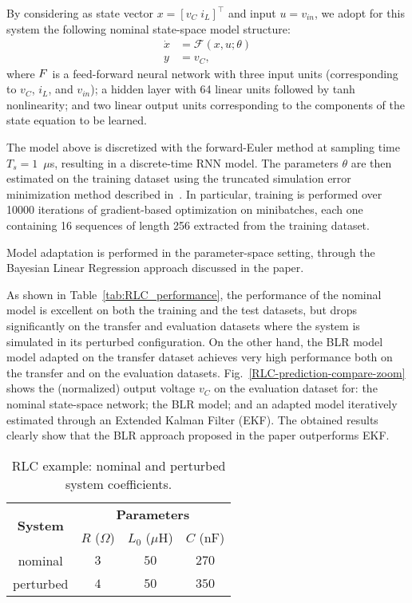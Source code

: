 \documentclass{article}
\newcommand{\F}{\mathcal{F}}
\begin{document}
By considering as state vector $x = [v_C\; i_L]^\top$ and input $u=v_{in}$, we adopt for this system the following nominal state-space model structure:
\begin{align*}
\dot x & = \mathcal{F}(x, u; \theta) \\
 y &= v_{C},
\end{align*}
where $\mathcal \F$ is a feed-forward neural network with three input units (corresponding to $v_C$, $i_L$, and $v_{in}$); a hidden layer with 64 linear units followed by tanh nonlinearity; and two linear output units corresponding to the components of the state equation to be learned. 

The model above is discretized with the forward-Euler method at sampling time $T_s = 1$~$\mu$s, resulting in a 
discrete-time RNN model. The parameters $\theta$ are then estimated on the training dataset using the  {truncated simulation error minimization} method described in~\cite{forgione2021continuous}. 
In particular, training is performed over 10000 iterations of gradient-based optimization on minibatches, each one containing
16 sequences of length 256 extracted from the training dataset. 

Model adaptation is performed in the parameter-space setting, through  the Bayesian Linear Regression approach discussed in the paper. 

As shown in Table~\ref{tab:RLC_performance}, the performance of the nominal model is excellent on both
the training and the test datasets,  but drops significantly on the transfer and evaluation datasets where the system is simulated in its perturbed configuration. On the other hand, the BLR model model adapted on the transfer dataset achieves very high performance both on the transfer and on the evaluation datasets. Fig.~\ref{RLC-prediction-compare-zoom} shows the (normalized) output voltage $v_C$ on the evaluation dataset for: the nominal state-space network; the BLR model; and an adapted model iteratively estimated through an Extended Kalman Filter (EKF). The obtained results clearly show that the BLR approach proposed in the paper outperforms EKF. 
 

\begin{table}%
\centering
\begin{tabular}{c | c  c  c}
\multirow{2}{*}{\textbf{System}} & \multicolumn{3}{c}{\textbf{Parameters}} \\
                & $R$ ($\Omega$)     & $L_0$ ($\mu$H)     & $C$ (nF)     \\ %
\hline
nominal         & $3$  & $50$  & $270$  \\
perturbed       & $4$   & $50$ & $350$ \\
\hline
\end{tabular}
\caption{RLC example: nominal and perturbed system coefficients.}
\label{tab:RLC_coefficients}
\end{table}
\end{document}
